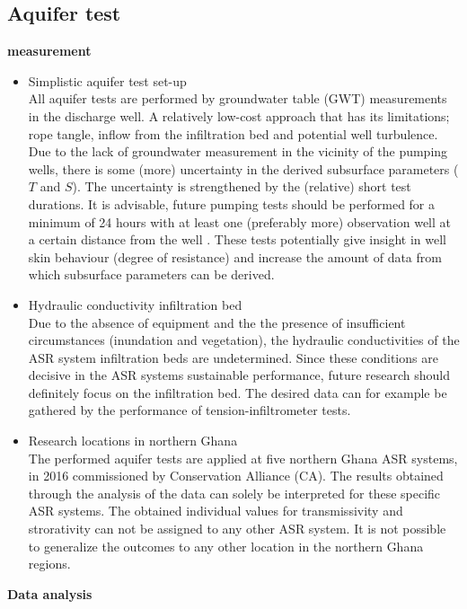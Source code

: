 \subsection{Aquifer test} 
\textbf{measurement}
\begin{itemize}
\item{Simplistic aquifer test set-up} \\
All aquifer tests are performed by groundwater table (GWT) measurements in the discharge well. A relatively low-cost approach that has its limitations; rope tangle, inflow from the infiltration bed and potential well turbulence. Due to the lack of groundwater measurement in the vicinity of the pumping wells, there is some (more) uncertainty in the derived subsurface parameters ($T$ and $S$). The uncertainty is strengthened by the (relative) short test durations. It is advisable, future pumping tests should be performed for a minimum of 24 hours with at least one (preferably more) observation well at a certain distance from the well \citep{Kruseman2000}. These tests potentially give insight in well skin behaviour (degree of resistance) and increase the amount of data from which subsurface parameters can be derived.
\item{Hydraulic conductivity infiltration bed} \\
Due to the absence of equipment and the the presence of insufficient circumstances (inundation and vegetation), the hydraulic conductivities of the ASR system infiltration beds are undetermined.  Since these conditions are decisive in the ASR systems sustainable performance, future research should definitely focus on the infiltration bed. The desired data can for example be gathered by the performance of tension-infiltrometer tests.
\item{Research locations in northern Ghana} \\
The performed aquifer tests are applied at five northern Ghana ASR systems, in 2016 commissioned by Conservation Alliance (CA). The results obtained through the analysis of the data can solely be interpreted for these specific ASR systems. The obtained individual values for transmissivity and strorativity can not be assigned to any other ASR system. It is not possible to generalize the outcomes to any other location in the northern Ghana regions. \\
\end{itemize}
\textbf{Data analysis}
